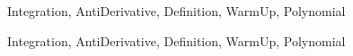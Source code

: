 \begin{tagblock}{Integration, AntiDerivative, Definition, WarmUp, Polynomial}
\begin{question}
	
\begin{tags}
	    Integration, AntiDerivative, Definition, WarmUp, Polynomial
\end{tags}
	
\begin{diary}
	   
\end{diary}
	
\begin{solution}
	   
	    \end{enumerate}
\end{solution}
	
\end{question}

\end{tagblock}


